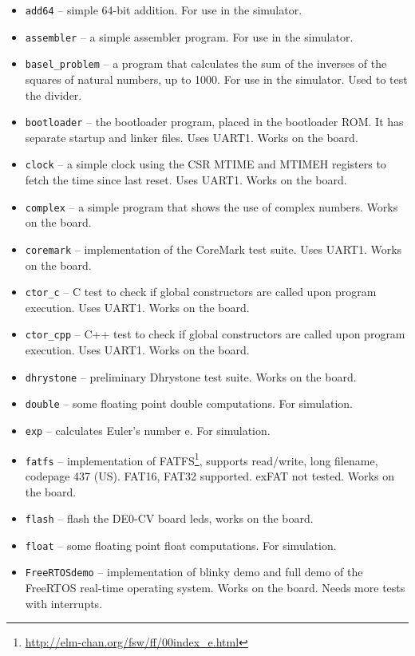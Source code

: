 \documentclass[12pt]{article}
\begin{document}
\begin{itemize}
\item \lstinline|add64| -- simple 64-bit addition. For use in the simulator.
\item \lstinline|assembler| -- a simple assembler program. For use in the simulator.
\item \lstinline|basel_problem| -- a program that calculates the sum of the inverses of the squares of natural numbers, up to 1000. For use in the simulator. Used to test the divider.
\item \lstinline|bootloader| -- the bootloader program, placed in the bootloader ROM. It has separate startup and linker files. Uses UART1. Works on the board.
\item \lstinline|clock| -- a simple clock using the CSR MTIME and MTIMEH registers to fetch the time since last reset. Uses UART1. Works on the board.
\item \lstinline|complex| -- a simple program that shows the use of complex numbers. Works on the board.
\item \lstinline|coremark| -- implementation of the CoreMark test suite. Uses UART1. Works on the board.
\item \lstinline|ctor_c| -- C test to check if global constructors are called upon program execution. Uses UART1. Works on the board.
\item \lstinline|ctor_cpp| -- C++ test to check if global constructors are called upon program execution. Uses UART1. Works on the board.
\item \lstinline|dhrystone| -- preliminary Dhrystone test suite. Works on the board.
\item \lstinline|double| -- some floating point double computations. For simulation.
\item \lstinline|exp| -- calculates Euler's number e. For simulation.
\item \lstinline|fatfs| -- implementation of FATFS\footnote{\url{http://elm-chan.org/fsw/ff/00index_e.html}}, supports read/write, long filename, codepage 437 (US). FAT16, FAT32 supported. exFAT not tested. Works on the board.
\item \lstinline|flash| -- flash the DE0-CV board leds, works on the board.
\item \lstinline|float| -- some floating point float computations. For simulation.
\item \lstinline|FreeRTOSdemo| -- implementation of blinky demo and full demo of the FreeRTOS real-time operating system. Works on the board. Needs more tests with interrupts.

\end{itemize}
\end{document}
